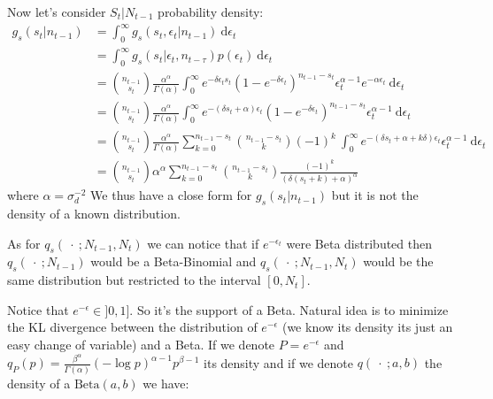 \documentclass{article}
\begin{document}
	Now let's consider $S_t | N_{t-1}$ probability density:
	\begin{equation*}
	\begin{split}
	g_s(s_t | n_{t-1}) & = \int_{0}^{\infty}g_s(s_t, \epsilon_t | n_{t-1})\ \mathrm{d}\epsilon_t \\
	& = \int_{0}^{\infty}g_s(s_t | \epsilon_t, n_{t-\tau})p(\epsilon_t)\ \mathrm{d}\epsilon_t \\
	& = \binom{n_{t-1}}{s_t}\frac{\alpha^\alpha}{\Gamma(\alpha)} \int_{0}^{\infty}e^{-\delta\epsilon_t s_t}(1-e^{-\delta\epsilon_t})^{n_{t-1}-s_t}\epsilon_t^{\alpha-1}e^{-\alpha\epsilon_t}\ \mathrm{d}\epsilon_t \\
	& = \binom{n_{t-1}}{s_t}\frac{\alpha^\alpha}{\Gamma(\alpha)}\int_{0}^{\infty}e^{-(\delta s_t+\alpha)\epsilon_t }(1-e^{-\delta\epsilon_t})^{n_{t-1}-s_t}\epsilon_t^{\alpha-1}\ \mathrm{d}\epsilon_t \\
	& = \binom{n_{t-1}}{s_t}\frac{\alpha^\alpha}{\Gamma(\alpha)}\sum_{k=0}^{n_{t-1}-s_t}\binom{n_{t-1}-s_t}{k}(-1)^k \ \int_{0}^{\infty}e^{-(\delta s_t+\alpha + k\delta)\epsilon_t }\epsilon_t^{\alpha-1}\ \mathrm{d}\epsilon_t \\
	& = \binom{n_{t-1}}{s_t}\alpha^\alpha\sum_{k=0}^{n_{t-1}-s_t}\binom{n_{t-1}-s_t}{k}\frac{(-1)^k}{(\delta(s_t+k)+\alpha)^\alpha}
	\end{split}
	\end{equation*}
	where $\alpha = \sigma_d^{-2}$
	We thus have a close form for $g_s(s_t | n_{t-1})$ but it is not the density of a known distribution.
	
	As for $q_s(\ \cdot \ ; N_{t-1}, N_t)$ we can notice that if $e^{-\epsilon_t}$ were Beta distributed then $q_s(\ \cdot \ ; N_{t-1})$ would be a Beta-Binomial and $q_s(\ \cdot \ ; N_{t-1}, N_t)$ would be the same distribution but restricted to the interval $[0, N_t]$. 
	
Notice that $e^{-\epsilon} \in ]0, 1]$. So it's the support of a Beta. Natural idea is to minimize the KL divergence between the distribution of $e^{-\epsilon}$ (we know its density its just an easy change of variable) and a Beta. 
If we denote $P=e^{-\epsilon}$ and $q_P(p)=\frac{\beta^\alpha}{\Gamma(\alpha)}(-\log p)^{\alpha-1}p^{\beta-1}$ its density and if we denote $q(\ \cdot \ ; a, b)$ the density of a $\mathrm{Beta}(a,b)$ we have:
\end{document}
